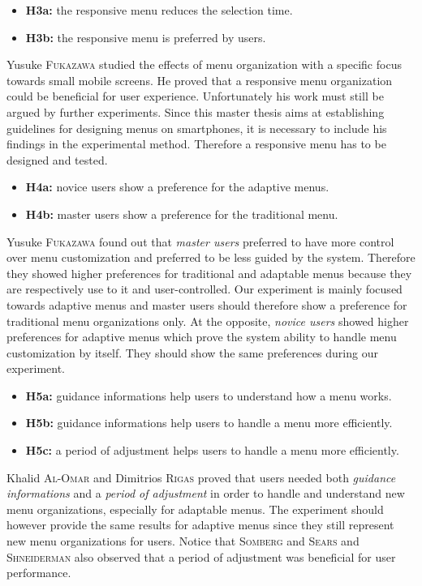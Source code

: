 \begin{itemize}
  \item \textbf{H3a:} the responsive menu reduces the selection time.
  \item \textbf{H3b:} the responsive menu is preferred by users.
\end{itemize}

Yusuke \textsc{Fukazawa} studied the effects of menu organization with a 
specific focus 
towards small mobile screens. He proved that a responsive menu organization 
could be beneficial for user experience. Unfortunately his work must still be 
argued by further experiments. Since this master thesis aims at establishing 
guidelines for designing menus on smartphones, it is necessary to include his 
findings in the experimental method. Therefore a responsive menu has to be 
designed and tested.

\begin{itemize}
  \item \textbf{H4a:} novice users show a preference for the adaptive menus.
  \item \textbf{H4b:} master users show a preference for the traditional menu.
\end{itemize}

Yusuke \textsc{Fukazawa} found out that \textit{master users} preferred to have 
more 
control over menu customization and preferred to be less guided by the system. 
Therefore they showed higher preferences for traditional and adaptable menus 
because they are respectively use to it and user-controlled. Our experiment is 
mainly focused towards adaptive menus and master users should therefore show a 
preference for traditional menu organizations only. At the opposite, 
\textit{novice users} showed higher preferences for adaptive menus which prove 
the system ability to handle menu customization by itself. They should show the 
same preferences during our experiment.

\begin{itemize}
  \item \textbf{H5a:} guidance informations help users to understand how a 
menu 
works.
  \item \textbf{H5b:} guidance informations help users to handle a menu more 
efficiently.
  \item \textbf{H5c:} a period of adjustment helps users to handle a menu more 
efficiently.
\end{itemize}

Khalid \textsc{Al-Omar} and Dimitrios \textsc{Rigas} proved that users needed 
both \textit{guidance informations} and a \textit{period of adjustment} in 
order to 
handle and understand new menu organizations, especially for adaptable menus. 
The experiment should however provide the same results for adaptive menus since 
they still represent new menu organizations for users. Notice that 
\textsc{Somberg}  
and \textsc{Sears} and \textsc{Shneiderman} also observed that a period of 
adjustment was 
beneficial for user performance.

